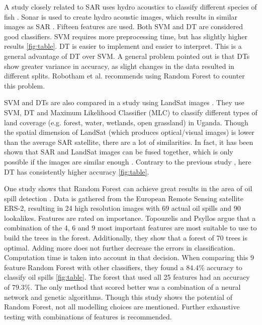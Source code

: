 A study closely related to SAR uses hydro acoustics to classify different species of fish \cite{Robotham2011170}. Sonar is used to create hydro acoustic images, which results in similar images as SAR \cite{griffiths2003synthetic}. Fifteen features are used. Both SVM and DT are considered good classifiers. SVM requires more preprocessing time, but has slightly higher results \ref{fig:table}. DT is easier to implement and easier to interpret. This is a general advantage of DT over SVM. A general problem pointed out is that DTs show greater variance in accuracy, as slight changes in the data resulted in different splits. Robotham et al. recommends using Random Forest to counter this problem.

SVM and DTs are also compared in a study using LandSat images \cite{Otukei2010S27}. They use SVM, DT and Maximum Likelihood Classifier (MLC) to classify different types of land coverage (e.g. forest, water, wetlands, open grassland) in Uganda. Though the spatial dimension of LandSat (which produces optical/visual images) is lower than the average SAR satellite, there are a lot of similarities. In fact, it has been shown that SAR and LandSat images can be fused together, which is only possible if the images are similar enough \cite{dupas2000sar}. Contrary to the previous study \cite{Robotham2011170}, here DT has consistently higher accuracy \ref{fig:table}.

One study shows that Random Forest can achieve great results in the area of oil spill detection \cite{Topouzelis201268}. Data is gathered from the European Remote Sensing satellite ERS-2, resulting in 24 high resolution images with 69 actual oil spills and 90 lookalikes. Features are rated on importance. Topouzelis and Psyllos argue that a combination of the 4, 6 and 9 most important features \cite{topouzelis2003oil} are most suitable to use to build the trees in the forest. Additionally, they show that a forest of 70 trees is optimal. Adding more does not further decrease the errors in classification. Computation time is taken into account in that decision. When comparing this 9 feature Random Forest with other classifiers, they found a $84.4$\% accuracy to classify oil spills \ref{fig:table}. The forest that used all 25 features had an accuracy of $79.3$\%. The only method that scored better was a combination of a neural network and genetic algorithms. Though this study shows the potential of Random Forest, not all modelling choices are mentioned. Further exhaustive testing with combinations of features is recommended.

